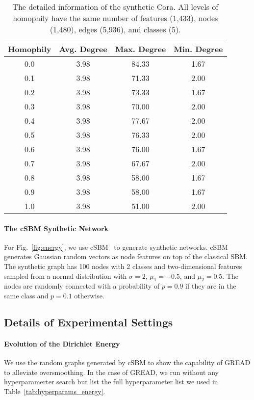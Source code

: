 \documentclass{article}
\theoremstyle{plain}
\theoremstyle{definition}
\theoremstyle{remark}
\begin{document}
\begin{table}[ht]
    \centering
    \caption{The detailed information of the synthetic Cora. All levels of homophily have the same number of features (1,433), nodes (1,480), edges (5,936), and classes (5).}
    \begin{tabular}{c ccc}\toprule
        Homophily & Avg. Degree & Max. Degree & Min. Degree\\ \midrule
        0.0 & 3.98 & 84.33 & 1.67 \\
        0.1 & 3.98 & 71.33 & 2.00 \\
        0.2 & 3.98 & 73.33 & 1.67 \\
        0.3 & 3.98 & 70.00 & 2.00 \\
        0.4 & 3.98 & 77.67 & 2.00 \\
        0.5 & 3.98 & 76.33 & 2.00 \\
        0.6 & 3.98 & 76.00 & 1.67 \\
        0.7 & 3.98 & 67.67 & 2.00 \\
        0.8 & 3.98 & 58.00 & 1.67 \\
        0.9 & 3.98 & 58.00 & 1.67 \\
        1.0 & 3.98 & 51.00 & 2.00 \\
        \bottomrule
    \end{tabular}
    \label{tab:syn_cora}
\end{table}

\paragraph{The cSBM Synthetic Network}
For Fig.~\ref{fig:energy}, we use cSBM~\cite{Deshpande2018cSBM} to generate synthetic networks. cSBM generates Gaussian random vectors as node features on top of the classical SBM. The synthetic graph has 100 nodes with 2 classes and two-dimensional features sampled from a normal distribution with $\sigma=2$, $\mu_1=-0.5$, and $\mu_2=0.5$. The nodes are randomly connected with a probability of $p=0.9$ if they are in the same class and $p=0.1$ otherwise.

\subsection{Details of Experimental Settings}\label{a:setting}
\paragraph{Evolution of the Dirichlet Energy}
We use the random graphs generated by cSBM to show the capability of GREAD to alleviate oversmoothing. In the case of GREAD, we run without any hyperparamerter search but list the full hyperparameter list we used in Table~\ref{tab:hyperparams_energy}.
\end{document}
